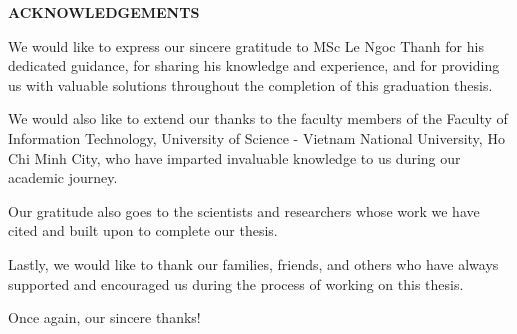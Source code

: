 \vspace{2cm}

{}

{\MakeUppercase\centering\Large\bfseries ACKNOWLEDGEMENTS}

\vspace{2cm}
{
	
We would like to express our sincere gratitude to MSc Le Ngoc Thanh for his dedicated guidance, for sharing his knowledge and experience, and for providing us with valuable solutions throughout the completion of this graduation thesis.

We would also like to extend our thanks to the faculty members of the Faculty of Information Technology, University of Science - Vietnam National University, Ho Chi Minh City, who have imparted invaluable knowledge to us during our academic journey.

Our gratitude also goes to the scientists and researchers whose work we have cited and built upon to complete our thesis.

Lastly, we would like to thank our families, friends, and others who have always supported and encouraged us during the process of working on this thesis.

Once again, our sincere thanks!

}



\pagebreak
